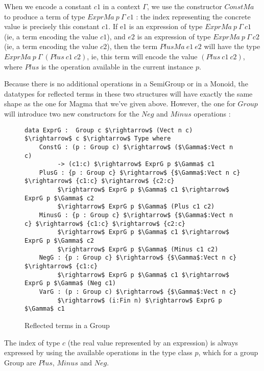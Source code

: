 When we encode a constant $c1$ in a context $\Gamma$, we use the constructor $ConstMa$ to produce a term of type $ExprMa\ p\ \Gamma\ c1$ : the index representing the concrete value is precisely this constant $c1$.
If e1 is an expression of type $ExprMa\ p\ \Gamma\ c1$ (ie, a term encoding the value $c1$), and $e2$ is an expression of type $ExprMa\ p\ \Gamma\ c2$ (ie, a term encoding the value $c2$), then the term $PlusMa\ e1\ e2$ will have the type $ExprMa\ p\ \Gamma\ (Plus\ c1\ c2)$, ie, this term will encode the value $(Plus\ c1\ c2)$, where $Plus$ is the operation available in the current instance $p$.


Because there is no additional operations in a SemiGroup or in a Monoid, the datatypes for reflected terms in these two structures will have exactly the same shape as the one for Magma that we've given above.
However, the one for $Group$ will introduce two new constructors for the $Neg$ and $Minus$ operations :


\begin{figure}[H]
\figrule
\begin{center}
\begin{lstlisting}
data ExprG :  Group c $\rightarrow$ (Vect n c) $\rightarrow$ c $\rightarrow$ Type where
    ConstG : (p : Group c) $\rightarrow$ ($\Gamma$:Vect n c) 
         -> (c1:c) $\rightarrow$ ExprG p $\Gamma$ c1
    PlusG : {p : Group c} $\rightarrow$ {$\Gamma$:Vect n c} $\rightarrow$ {c1:c} $\rightarrow$ {c2:c} 
         $\rightarrow$ ExprG p $\Gamma$ c1 $\rightarrow$ ExprG p $\Gamma$ c2 
         $\rightarrow$ ExprG p $\Gamma$ (Plus c1 c2)
    MinusG : {p : Group c} $\rightarrow$ {$\Gamma$:Vect n c} $\rightarrow$ {c1:c} $\rightarrow$ {c2:c} 
         $\rightarrow$ ExprG p $\Gamma$ c1 $\rightarrow$ ExprG p $\Gamma$ c2 
         $\rightarrow$ ExprG p $\Gamma$ (Minus c1 c2)
    NegG : {p : Group c} $\rightarrow$ {$\Gamma$:Vect n c} $\rightarrow$ {c1:c} 
         $\rightarrow$ ExprG p $\Gamma$ c1 $\rightarrow$ ExprG p $\Gamma$ (Neg c1)
    VarG : (p : Group c) $\rightarrow$ {$\Gamma$:Vect n c} 
         $\rightarrow$ (i:Fin n) $\rightarrow$ ExprG p $\Gamma$ c1
\end{lstlisting}
\end{center}
\caption{Reflected terms in a Group}
\label{ExprG}
\figrule
\end{figure}

The index of type $c$ (the real value represented by an expression) is always expressed by using the available operations in the type class $p$, which for a group Group are $Plus$, $Minus$ and $Neg$.

